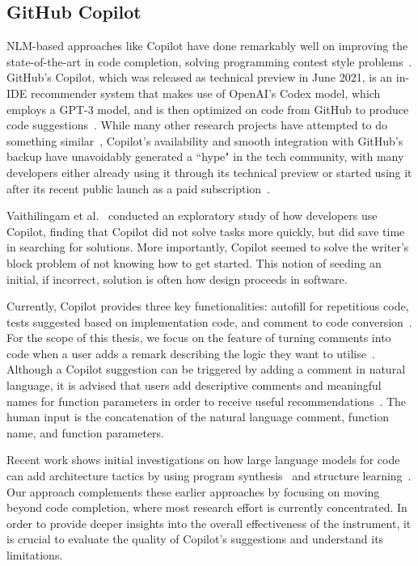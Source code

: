 \subsection{GitHub Copilot}
NLM-based approaches like Copilot have done remarkably well on improving the state-of-the-art in code completion, solving programming contest style problems~\cite{empirical_eval}.
GitHub's Copilot, which was released as technical preview in June 2021, is an in-IDE recommender system that makes use of OpenAI's Codex model, which employs a GPT-3 model, and is then optimized on code from GitHub to produce code suggestions~\cite{Copilot-web}. 
While many other research projects have attempted to do something similar~\cite{codesearch, natural, coacor}, Copilot's availability and smooth integration with GitHub's backup have unavoidably generated a ``hype" in the tech community, with many developers either already using it through its technical preview or started using it after its recent public launch as a paid subscription~\cite{Copilot-web}. 

Vaithilingam et al.~\cite{Vaithilingam2022} conducted an exploratory study of how developers use Copilot, finding that Copilot did not solve tasks more quickly, but did save time in searching for solutions. More importantly, Copilot seemed to solve the writer's block problem of not knowing how to get started. This notion of seeding an initial, if incorrect, solution is often how design proceeds in software. 

Currently, Copilot provides three key functionalities: autofill for repetitious code, tests suggested based on implementation code, and comment to code conversion~\cite{Copilot-web}. For the scope of this thesis, we focus on the feature of turning comments into code when a user adds a remark describing the logic they want to utilise~\cite{Copilot-web}. Although a Copilot suggestion can be triggered by adding a comment in natural language, it is advised that users add descriptive comments and meaningful names for function parameters in order to receive useful recommendations~\cite{Copilot-web}. The human input is the concatenation of the natural language comment, function name, and function parameters.

Recent work shows initial investigations on how large language models for code can add architecture tactics by using program synthesis~\cite{Shokri2021} and structure learning~\cite{Karmakar2021}.
Our approach complements these earlier approaches by focusing on moving beyond code completion, where most research effort is currently concentrated.
In order to provide deeper insights into the overall effectiveness of the instrument, it is crucial to evaluate the quality of Copilot's suggestions and understand its limitations.

